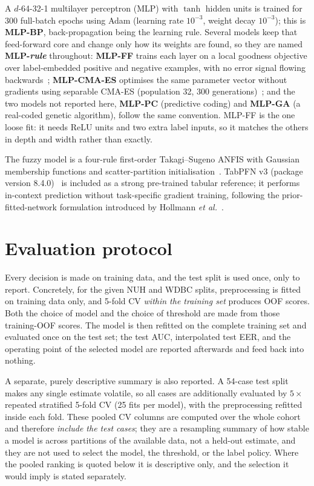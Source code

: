 \documentclass[11pt,a4paper]{article}
\begin{document}
A $d$-64-32-1 multilayer perceptron (MLP) with $\tanh$ hidden units is trained for 300 full-batch epochs using Adam (learning rate $10^{-3}$, weight decay $10^{-3}$); this is \textbf{MLP-BP}, back-propagation being the learning rule. Several models keep that feed-forward core and change only how its weights are found, so they are named \textbf{MLP-\emph{rule}} throughout: \textbf{MLP-FF} trains each layer on a local goodness objective over label-embedded positive and negative examples, with no error signal flowing backwards~\cite{ff2022}; \textbf{MLP-CMA-ES} optimises the same parameter vector without gradients using separable CMA-ES (population 32, 300 generations)~\cite{hansen}; and the two models not reported here, \textbf{MLP-PC} (predictive coding) and \textbf{MLP-GA} (a real-coded genetic algorithm), follow the same convention. MLP-FF is the one loose fit: it needs ReLU units and two extra label inputs, so it matches the others in depth and width rather than exactly.

The fuzzy model is a four-rule first-order Takagi--Sugeno ANFIS with Gaussian membership functions and scatter-partition initialisation~\cite{jang1993}. TabPFN v3 (package version 8.4.0)~\cite{tabpfnv3} is included as a strong pre-trained tabular reference; it performs in-context prediction without task-specific gradient training, following the prior-fitted-network formulation introduced by Hollmann \emph{et al.}~\cite{tabpfn}.
\section{Evaluation protocol}
Every decision is made on training data, and the test split is used once, only to report. Concretely, for the given NUH and WDBC splits, preprocessing is fitted on training data only, and 5-fold CV \emph{within the training set} produces OOF scores. Both the choice of model and the choice of threshold are made from those training-OOF scores. The model is then refitted on the complete training set and evaluated once on the test set; the test AUC, interpolated test EER, and the operating point of the selected model are reported afterwards and feed back into nothing.

A separate, purely descriptive summary is also reported. A 54-case test split makes any single estimate volatile, so all cases are additionally evaluated by $5\times$ repeated stratified 5-fold CV (25 fits per model), with the preprocessing refitted inside each fold. These pooled CV columns are computed over the whole cohort and therefore \emph{include the test cases}; they are a resampling summary of how stable a model is across partitions of the available data, not a held-out estimate, and they are not used to select the model, the threshold, or the label policy. Where the pooled ranking is quoted below it is descriptive only, and the selection it would imply is stated separately.
\end{document}
